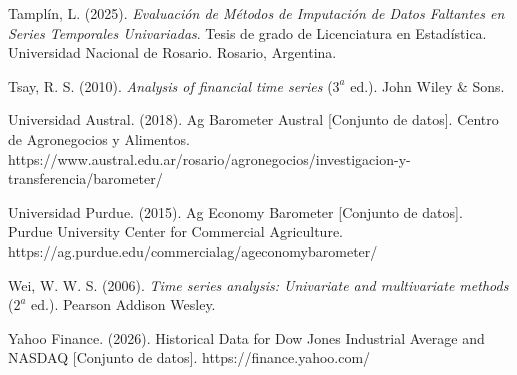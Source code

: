 \documentclass[12pt]{article}
\begin{document}
Tamplín, L. (2025). \emph{Evaluación de Métodos de Imputación de Datos
Faltantes en Series Temporales Univariadas}. Tesis de grado de
Licenciatura en Estadística. Universidad Nacional de Rosario. Rosario,
Argentina.

Tsay, R. S. (2010). \emph{Analysis of financial time series} (\(3^a\)
ed.). John Wiley \& Sons.

Universidad Austral. (2018). Ag Barometer Austral {[}Conjunto de
datos{]}. Centro de Agronegocios y Alimentos.
https://www.austral.edu.ar/rosario/agronegocios/investigacion-y-transferencia/barometer/

Universidad Purdue. (2015). Ag Economy Barometer {[}Conjunto de
datos{]}. Purdue University Center for Commercial Agriculture.
https://ag.purdue.edu/commercialag/ageconomybarometer/

Wei, W. W. S. (2006). \emph{Time series analysis: Univariate and
multivariate methods} (\(2^a\) ed.). Pearson Addison Wesley.

Yahoo Finance. (2026). Historical Data for Dow Jones Industrial Average
and NASDAQ {[}Conjunto de datos{]}. https://finance.yahoo.com/
\end{document}
